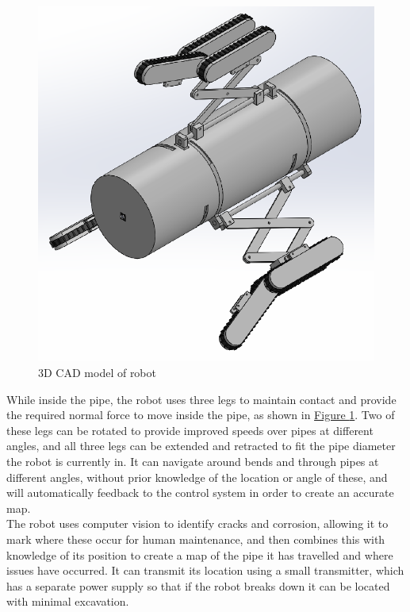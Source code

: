 \documentclass[11pt]{article}		%
\newlength{\imageheight}	 %
\begin{document}
	\begin{figure}[h] %
		\centering
		\includegraphics[height=\imageheight]{overviewCAD}
		\caption{3D CAD model of robot}
		\label{3DSketch}
	\end{figure}
	
	While inside the pipe, the robot uses three legs to maintain contact and provide the required normal force to move inside the pipe, as shown in \hyperref[3DSketch]{Figure \ref*{3DSketch}}.
	Two of these legs can be rotated to provide improved speeds over pipes at different angles, and all three legs can be extended and retracted to fit the pipe diameter the robot is currently in.
	It can navigate around bends and through pipes at different angles, without prior knowledge of the location or angle of these, and will automatically feedback to the control system in order to create an accurate map.
	\\
	The robot uses computer vision to identify cracks and corrosion, allowing it to mark where these occur for human maintenance, and then combines this with knowledge of its position to create a map of the pipe it has travelled and where issues have occurred.
	It can transmit its location using a small transmitter, which has a separate power supply so that if the robot breaks down it can be located with minimal excavation.
	
\end{document}
